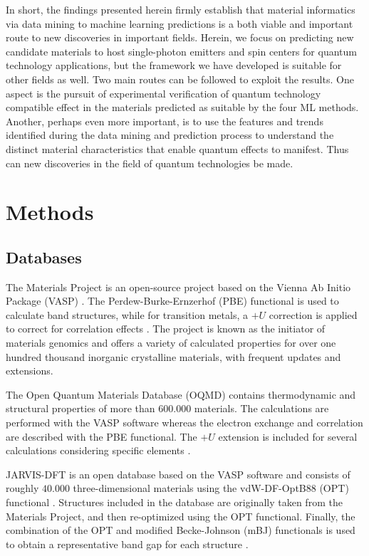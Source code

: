 \documentclass[superscriptaddress,unsortedaddress,
 amsmath,amssymb,
 aps,
]{revtex4-2}
\begin{document}
In short, the findings presented herein firmly establish that material informatics via data mining to machine learning predictions is a both viable and important route to new discoveries in important fields. Herein, we focus on predicting new candidate materials to host single-photon emitters and spin centers for quantum technology applications, but the framework we have developed is suitable for other fields as well. 
Two main routes can be followed to exploit the results. One aspect is the pursuit of experimental verification of quantum technology compatible effect in the materials predicted as suitable by the four ML methods.  
Another, perhaps even more important, is to use the features and trends identified during the data mining and prediction process to understand the distinct material characteristics that enable quantum effects to manifest. Thus can new discoveries in the field of quantum technologies be made. 


\section*{Methods}

\subsection*{Databases} 
The Materials Project \cite{Jain2013, Jain2018} is an open-source project based on the Vienna Ab Initio Package (VASP) \cite{Kresse1996}. The Perdew-Burke-Ernzerhof \cite{Perdew1996} (PBE) functional is used to calculate band structures, while for transition metals, a $+U$ correction is applied to correct for correlation effects \cite{Wang2006}. The project is known as the initiator of materials genomics and offers a variety of calculated properties for over one hundred thousand inorganic crystalline materials, with frequent updates and extensions. 

The Open Quantum Materials Database (OQMD) \cite{Saal2013, Kirklin2015} contains thermodynamic and structural properties of more than $600.000$  materials. The calculations are performed with the VASP software whereas the electron exchange and correlation are described with the PBE functional. The $+U$ extension is included for several calculations considering specific elements \cite{Stevanovic2012}. 

JARVIS-DFT \cite{Choudhary2020} is an open database based on the VASP software and consists of roughly $40.000$ three-dimensional materials using the vdW-DF-OptB88 (OPT) functional \cite{Thonhauser2007, Klimes2011}. Structures included in the database are originally taken from the Materials
Project, and then re-optimized using the OPT functional. Finally, the combination of the OPT and modified Becke-Johnson (mBJ) functionals is used to obtain a representative band gap for each structure \cite{Choudhary2018a}. 
\end{document}
